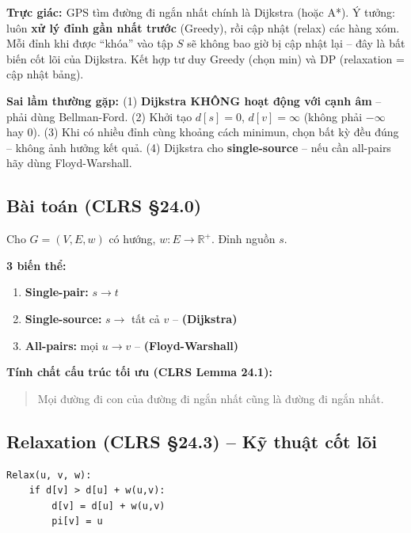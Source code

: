 \documentclass[10pt]{article}
\newcommand{\intuition}[1]{%
  \begin{tcolorbox}[colback=blue!5!white, colframe=blue!60!white, leftrule=3pt,
    toprule=0pt, bottomrule=0pt, rightrule=0pt,
    boxsep=2pt, left=6pt, right=6pt, top=4pt, bottom=4pt]
  \small\textbf{\textcolor{blue!80!black}{Trực giác: }}#1
  \end{tcolorbox}}
\newcommand{\pitfall}[1]{%
  \begin{tcolorbox}[colback=red!5!white, colframe=red!60!white, leftrule=3pt,
    toprule=0pt, bottomrule=0pt, rightrule=0pt,
    boxsep=2pt, left=6pt, right=6pt, top=4pt, bottom=4pt]
  \small\textbf{\textcolor{red!70!black}{Sai lầm thường gặp: }}#1
  \end{tcolorbox}}
\providecommand{\tightlist}{\setlength{\itemsep}{0pt}\setlength{\parskip}{0pt}}
\begin{document}
\intuition{GPS tìm đường đi ngắn nhất chính là Dijkstra (hoặc A*). Ý tưởng: luôn \textbf{xử lý đỉnh gần nhất trước} (Greedy), rồi cập nhật (relax) các hàng xóm. Mỗi đỉnh khi được ``khóa'' vào tập $S$ sẽ không bao giờ bị cập nhật lại -- đây là bất biến cốt lõi của Dijkstra. Kết hợp tư duy Greedy (chọn min) và DP (relaxation = cập nhật bảng).}

\pitfall{(1) \textbf{Dijkstra KHÔNG hoạt động với cạnh âm} -- phải dùng Bellman-Ford. (2) Khởi tạo $d[s] = 0$, $d[v] = \infty$ (không phải $-\infty$ hay $0$). (3) Khi có nhiều đỉnh cùng khoảng cách minimun, chọn bất kỳ đều đúng -- không ảnh hưởng kết quả. (4) Dijkstra cho \textbf{single-source} -- nếu cần all-pairs hãy dùng Floyd-Warshall.}

\subsection{\texorpdfstring{Bài toán (CLRS
\S 24.0)}{Bài toán (CLRS 24.0)}}\label{buxe0i-touxe1n-clrs-24.0}

Cho \(G = (V, E, w)\) có hướng, \(w: E \to \mathbb{R}^+\). Đỉnh nguồn
\(s\).

\textbf{3 biến thể:}

\begin{enumerate}
\def\labelenumi{\arabic{enumi}.}
\tightlist
\item
  \textbf{Single-pair:} \(s \to t\)
\item
  \textbf{Single-source:} \(s \to\) tất cả \(v\) -- \textbf{(Dijkstra)}
\item
  \textbf{All-pairs:} mọi \(u \to v\) -- \textbf{(Floyd-Warshall)}
\end{enumerate}

\textbf{Tính chất cấu trúc tối ưu (CLRS Lemma 24.1):}

\begin{quote}
Mọi đường đi con của đường đi ngắn nhất cũng là đường đi ngắn nhất.
\end{quote}

\subsection{\texorpdfstring{Relaxation (CLRS \S 24.3) -- Kỹ thuật
cốt
lõi}{Relaxation (CLRS 24.3) -- Kỹ thuật cốt lõi}}\label{relaxation-clrs-24.3-kux1ef9-thuux1eadt-cux1ed1t-luxf5i}

\begin{tcolorbox}[colback=gray!8, colframe=gray!50, boxrule=0.5pt, arc=2pt,
  left=6pt, right=6pt, top=4pt, bottom=4pt,
  title={\small\textbf{Pseudocode 15: Relaxation}}]
\begin{verbatim}
Relax(u, v, w):
    if d[v] > d[u] + w(u,v):
        d[v] = d[u] + w(u,v)
        pi[v] = u
\end{verbatim}
\end{tcolorbox}
\end{document}
